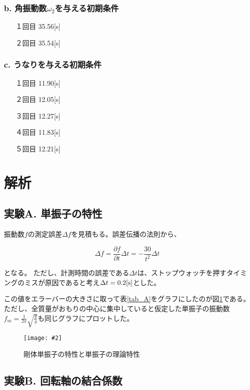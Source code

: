 \documentclass[uplatex,11pt]{jsarticle}
\newcommand{\fg}[3]{ %
    \begin{figure}
        \begin{center}
            \texttt{[image: \#2]}
            \caption{#3}
            \label{fg_#1}
        \end{center}
    \end{figure}
}
\newcommand{\fr}[1]{図\ref{fg_#1}}
\newcommand{\tr}[1]{表\ref{tab_#1}}
\begin{document}
\subsubsection*{b. 角振動数$\omega_2$を与える初期条件}
\begin{itemize}
    \item[１回目] 35.56[s]
    \item[２回目] 35.54[s]
\end{itemize}

\subsubsection*{c. うなりを与える初期条件}
\begin{itemize}
    \item[１回目] 11.90[s]
    \item[２回目] 12.05[s]
    \item[３回目] 12.27[s]
    \item[４回目] 11.83[s]
    \item[５回目] 12.21[s]
\end{itemize}

\section{解析}

\subsection*{実験A. 単振子の特性}

振動数$f$の測定誤差$\Delta f$を見積もる。誤差伝播の法則から、

\[
    \Delta f = \frac{\partial f}{\partial t} \Delta t = - \frac{30}{t^2} \Delta t
\]

となる。
ただし、計測時間の誤差である$\Delta t$は、ストップウォッチを押すタイミングのミスが原因であると考え$\Delta t = 0.2[{\rm s}]$とした。

この値をエラーバーの大きさに取って\tr{A}をグラフにしたのが\fr{A}である。ただし、全質量がおもりの中心に集中していると仮定した単振子の振動数$f_{m} = \frac{1}{2\pi}\sqrt{\frac{g}{y}}$も同じグラフにプロットした。

\fg{A}{graph/a_with_model.png}{剛体単振子の特性と単振子の理論特性}

\subsection*{実験B. 回転軸の結合係数}
\end{document}
